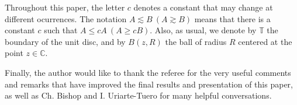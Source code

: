 \documentclass[12pt,a4paper]{article}
\theoremstyle{definition}
\theoremstyle{remark}
\newcommand{\C}{\mathbb{C}}
\newcommand{\T}{\mathbb{T}}
\numberwithin{komcounter}{section}
\begin{document}
	


 
 Throughout this paper, the letter $c$ denotes a constant that may change at different ocurrences. The notation $A \lesssim B~ (A\gtrsim B)$ means that there is a constant $c$ such that $ A \leq cA ~ (A\geq c B)$. Also, as usual, we denote by $\T$ the boundary of the unit disc, and by $B(z, R)$ the ball of radius $R$ centered at the point $z\in \C$.
 
 Finally, the author would like to thank the referee for the very useful comments and remarks that have improved the final results and presentation of this paper, as well as Ch. Bishop and I. Uriarte-Tuero for many helpful conversations.
 
	 
	 
	 
	 
	
	 
	
	 
	 
	 
	
	 
	 
	

	
\end{document}
